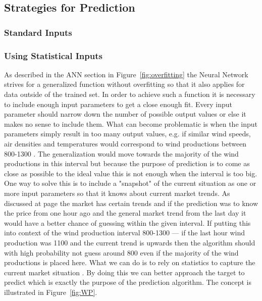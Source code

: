 \subsection{Strategies for Prediction}
\subsubsection{Standard Inputs}

\subsubsection{Using Statistical Inputs}
As described in the ANN section  in Figure~\ref{fig:overfitting} the Neural Network strives for a generalized function without overfitting so that it also applies for data outside of the trained set. In order to achieve such a function it is necessary to include enough input parameters to get a close enough fit. Every input parameter should narrow down the number of possible output values or else it makes no sense to include them. What can become problematic is when the input parameters simply result in too many output values, e.g. if similar wind speeds, air densities and temperatures would correspond to wind productions between 800-1300 . The generalization would move towards the majority of the wind productions in this interval but because the purpose of prediction is to come as close as possible to the ideal value this is not enough when the interval is too big. One way to solve this is to include a "snapshot" of the current situation as one or more input parameters so that it knows about current market trends. As discussed at page  the market has certain trends  and if the prediction was to know the price from one hour ago and the general market trend from the last day it would have a better chance of guessing within the given interval. If putting this into context of the wind production interval 800-1300 --- if the last hour wind production was 1100 and the current trend is upwards then the algorithm should with high probability not guess around 800 even if the majority of the wind productions is placed here. What we can do is to rely on statistics to capture the current market situation . By doing this we can better approach the target to predict which is exactly the purpose of the prediction algorithm. The concept is illustrated in Figure~\ref{fig:WP}.


